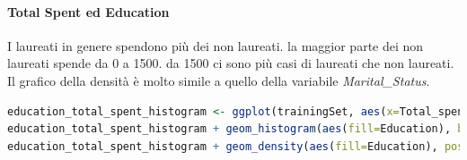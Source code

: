 \documentclass[letterpaper,11pt]{article}
\begin{document}
\newpage
\paragraph{Total Spent ed Education}
I laureati in genere spendono più dei non laureati. la maggior parte dei non laureati spende da 0 a 1500. da 1500 ci sono più casi di laureati che non laureati.
Il grafico della densità   è molto simile a quello della variabile \textit{Marital\_Status}.

\begin{lstlisting}[language=R]
education_total_spent_histogram <- ggplot(trainingSet, aes(x=Total_spent)) + facet_grid(Education~.)
education_total_spent_histogram + geom_histogram(aes(fill=Education), binwidth = 15, colour = "Black")
education_total_spent_histogram + geom_density(aes(fill=Education), position = "Stack")
\end{lstlisting}
\end{document}
